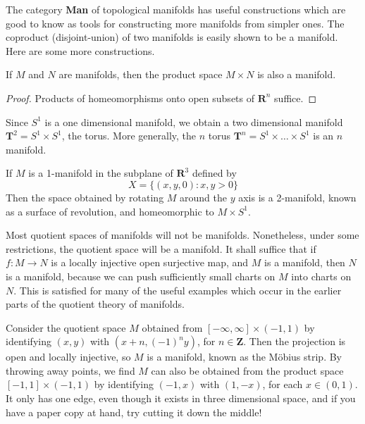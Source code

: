 The category {\bf Man} of topological manifolds has useful constructions which are good to know as tools for constructing more manifolds from simpler ones. The coproduct (disjoint-union) of two manifolds is easily shown to be a manifold. Here are some more constructions.

\begin{theorem}
    If $M$ and $N$ are manifolds, then the product space $M \times N$ is also a manifold.
\end{theorem}
\begin{proof}
    Products of homeomorphisms onto open subsets of $\mathbf{R}^n$ suffice.
\end{proof}

\begin{example}
    Since $S^1$ is a one dimensional manifold, we obtain a two dimensional manifold $\mathbf{T}^2 = S^1 \times S^1$, the torus. More generally, the $n$ torus $\mathbf{T}^n = S^1 \times \dots \times S^1$ is an $n$ manifold.
\end{example}

\begin{example}
    If $M$ is a 1-manifold in the subplane of $\mathbf{R}^3$ defined by
    \[ X = \{ (x,y,0): x,y > 0 \} \]
    Then the space obtained by rotating $M$ around the $y$ axis is a 2-manifold, known as a surface of revolution, and homeomorphic to $M \times S^1$.
\end{example}

Most quotient spaces of manifolds will not be manifolds. Nonetheless, under some restrictions, the quotient space will be a manifold. It shall suffice that if $f:M \to N$ is a locally injective open surjective map, and $M$ is a manifold, then $N$ is a manifold, because we can push sufficiently small charts on $M$ into charts on $N$. This is satisfied for many of the useful examples which occur in the earlier parts of the quotient theory of manifolds.

\begin{example}
    Consider the quotient space $M$ obtained from $[-\infty, \infty] \times (-1,1)$ by identifying $(x,y)$ with $(x + n, (-1)^n y)$, for $n \in \mathbf{Z}$. Then the projection is open and locally injective, so $M$ is a manifold, known as the M\"{o}bius strip. By throwing away points, we find $M$ can also be obtained from the product space $[-1,1] \times (-1,1)$ by identifying $(-1,x)$ with $(1,-x)$, for each $x \in (0,1)$. It only has one edge, even though it exists in three dimensional space, and if you have a paper copy at hand, try cutting it down the middle!
\end{example}

